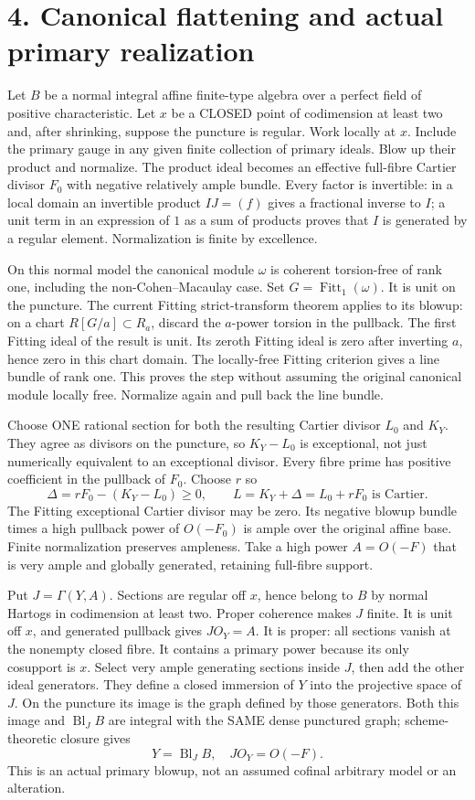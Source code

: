 \documentclass[11pt]{article}
\begin{document}
\section{4. Canonical flattening and actual primary realization}

Let \(B\) be a normal integral affine finite-type algebra over a perfect field of positive characteristic. Let \(x\) be a CLOSED point of codimension at least two and, after shrinking, suppose the puncture is regular. Work locally at \(x\). Include the primary gauge in any given finite collection of primary ideals. Blow up their product and normalize. The product ideal becomes an effective full-fibre Cartier divisor \(F_0\) with negative relatively ample bundle. Every factor is invertible: in a local domain an invertible product \(IJ=(f)\) gives a fractional inverse to \(I\); a unit term in an expression of \(1\) as a sum of products proves that \(I\) is generated by a regular element. Normalization is finite by excellence.

On this normal model the canonical module \(\omega\) is coherent torsion-free of rank one, including the non-Cohen--Macaulay case. Set \(G=\operatorname{Fitt}_1(\omega)\). It is unit on the puncture. The current Fitting strict-transform theorem applies to its blowup: on a chart \(R[G/a]\subset R_a\), discard the \(a\)-power torsion in the pullback. The first Fitting ideal of the result is unit. Its zeroth Fitting ideal is zero after inverting \(a\), hence zero in this chart domain. The locally-free Fitting criterion gives a line bundle of rank one. This proves the step without assuming the original canonical module locally free. Normalize again and pull back the line bundle.

Choose ONE rational section for both the resulting Cartier divisor \(L_0\) and \(K_Y\). They agree as divisors on the puncture, so \(K_Y-L_0\) is exceptional, not just numerically equivalent to an exceptional divisor. Every fibre prime has positive coefficient in the pullback of \(F_0\). Choose \(r\) so
\[
\Delta=rF_0-(K_Y-L_0)\ge0,
\qquad L=K_Y+\Delta=L_0+rF_0\text{ is Cartier}.
\]
The Fitting exceptional Cartier divisor may be zero. Its negative blowup bundle times a high pullback power of \(O(-F_0)\) is ample over the original affine base. Finite normalization preserves ampleness. Take a high power \(A=O(-F)\) that is very ample and globally generated, retaining full-fibre support.

Put \(J=\Gamma(Y,A)\). Sections are regular off \(x\), hence belong to \(B\) by normal Hartogs in codimension at least two. Proper coherence makes \(J\) finite. It is unit off \(x\), and generated pullback gives \(JO_Y=A\). It is proper: all sections vanish at the nonempty closed fibre. It contains a primary power because its only cosupport is \(x\). Select very ample generating sections inside \(J\), then add the other ideal generators. They define a closed immersion of \(Y\) into the projective space of \(J\). On the puncture its image is the graph defined by those generators. Both this image and \(\operatorname{Bl}_J B\) are integral with the SAME dense punctured graph; scheme-theoretic closure gives
\[
Y=\operatorname{Bl}_J B,
\quad JO_Y=O(-F).
\]
This is an actual primary blowup, not an assumed cofinal arbitrary model or an alteration.
\end{document}
